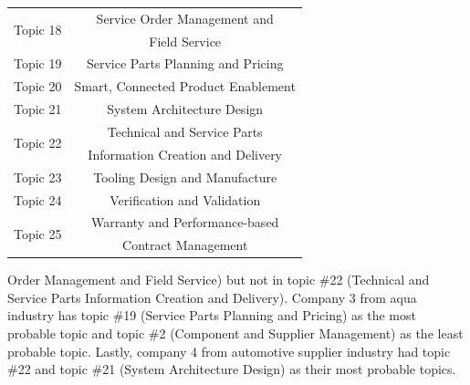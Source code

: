 \documentclass[10pt, conference, compsocconf]{IEEEtran}
\begin{document}
\begin{table}[h]
{\begin{tabular}{|c|c|}
\hline
\multirow{2}{*}{Topic 18}&Service Order Management and\\
&Field Service \\
\hline
Topic 19&Service Parts Planning and Pricing \\
\hline
Topic 20&Smart, Connected Product Enablement \\
\hline
Topic 21&System Architecture Design \\
\hline
\multirow{2}{*}{Topic 22}&Technical and Service Parts \\
&Information Creation and Delivery\\
\hline
Topic 23&Tooling Design and Manufacture \\
\hline
Topic 24&Verification and Validation \\
\hline
\multirow{2}{*}{Topic 25}&Warranty and Performance-based \\
&Contract Management\\
\hline
\end{tabular}}
\end{table}Order Management and Field Service) but not in topic \#22 (Technical and Service Parts Information Creation and Delivery). Company 3 from aqua industry has topic \#19 (Service Parts Planning and Pricing) as the most probable topic and topic \#2 (Component and Supplier Management) as the least probable topic. Lastly, company 4 from automotive supplier industry had topic \#22 and topic \#21 (System Architecture Design) as their most probable topics.


%
\end{document}

